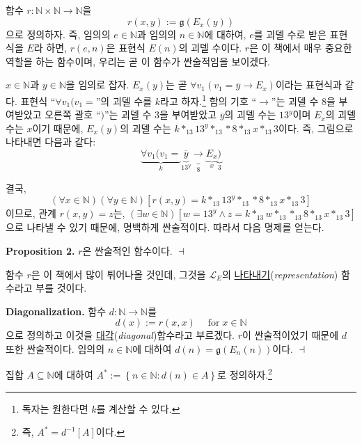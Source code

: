 \documentclass[12pt]{paper}
\newcommand{\gnum}
{ \mathfrak{g} }
\newenvironment{context}[1][]
{ \noindent \textbf{{#1}.} }
{ \hfill $ \dashv $ }
\begin{document}
함수 $r : \mathbb{N} \times \mathbb{N} \to \mathbb{N}$을 $$ r \left( x , y \right) := \gnum \left( E_x \left( y \right) \right) $$으로 정의하자.
즉, 임의의 $e \in \mathbb{N}$과 임의의 $n \in \mathbb{N}$에 대하여,
$e$를 괴델 수로 받은 표현식을 $E$라 하면, $r \left( e , n \right)$은 표현식 $E \left( n \right)$의 괴델 수이다.
$r$은 이 책에서 매우 중요한 역할을 하는 함수이며, 우리는 곧 이 함수가 싼술적임을 보이겠다.

$x \in \mathbb{N}$과 $y \in \mathbb{N}$을 임의로 잡자.
$E_x \left( y \right)$는 곧 $\forall v_1 \left( v_1 = \overline{y} \rightarrow E_x \right)$이라는 표현식과 같다.
표현식 ``$ \forall v_1 ( v_1 = $''의 괴델 수를 $k$라고 하자.\footnote
{
독자는 원한다면 $k$를 계산할 수 있다.
}
함의 기호 ``$\rightarrow$''는 괴델 수 $8$을 부여받았고
오른쪽 괄호 ``$)$''는 괴델 수 $3$을 부여받았고
$\overline{y}$의 괴델 수는 $13^{y}$이며 $E_x$의 괴델 수는 $x$이기 때문에,
$E_x \left( y \right)$의 괴델 수는 $k *_{13} 13^{y} *_{13} * 8 *_{13} x *_{13} 3$이다.
즉, 그림으로 나타내면 다음과 같다: $$ \underbrace{\forall v_1 ( v_1 =}_{k} \underbrace{\overline{y}}_{13^{y}} \underbrace{\rightarrow}_{8} \underbrace{E_x}_{x} \underbrace{)}_{3}$$

결국, $$\left( \forall x \in \mathbb{N} \right) \left( \forall y \in \mathbb{N} \right) \left[ r \left( x , y \right) = k *_{13} 13^{y} *_{13} * 8 *_{13} x *_{13} 3 \right]$$이므로,
관계 $r \left( x , y \right) = z$는, $\left( \exists w \in \mathbb{N} \right) \left[ w = 13^{y} \land z = k *_{13} w *_{13} *_{13} 8 *_{13} x *_{13} 3 \right]$으로 나타낼 수 있기 때문에, 명백하게 싼술적이다.
따라서 다음 명제를 얻는다.

\begin{context}[Proposition 2]
$r$은 싼술적인 함수이다.
\end{context}

함수 $r$은 이 책에서 많이 튀어나올 것인데, 그것을 $\mathcal{L}_{E}$의 \underline{나타내기}(\textit{representation}) 함수라고 부를 것이다.

\begin{context}[Diagonalization]
함수 $d : \mathbb{N} \to \mathbb{N}$를 $$d \left( x \right) := r \left( x , x \right) \quad \mathop{\mathrm{for}} x \in \mathbb{N} $$으로 정의하고
이것을 \underline{대각}(\textit{diagonal})함수라고 부르겠다.
$r$이 싼술적이었기 때문에 $d$ 또한 싼술적이다.
임의의 $n \in \mathbb{N}$에 대하여 $d \left( n \right) = \gnum \left( E_{n} \left( n \right) \right)$이다.
\end{context}

집합 $A \subseteq \mathbb{N}$에 대하여 $A^{*} := \left\{ n \in \mathbb{N} : d \left( n \right) \in A \right\}$로 정의하자.\footnote
{
즉, $A^{*} = d^{-1} \left[ A \right]$이다.
}
\end{document}
